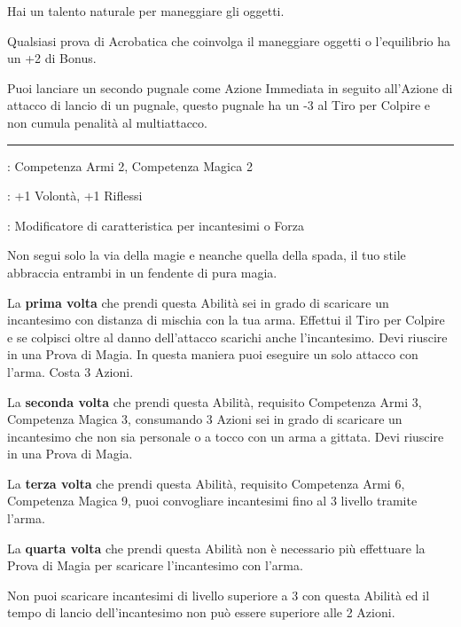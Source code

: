 \begin{multicols}{2}
Hai un talento naturale per maneggiare gli oggetti.

Qualsiasi prova di Acrobatica che coinvolga il maneggiare oggetti o l'equilibrio ha un +2 di Bonus.

Puoi lanciare un secondo pugnale come Azione Immediata in seguito all'Azione di attacco di lancio di un pugnale, questo pugnale ha un -3 al Tiro per Colpire e non cumula penalità al multiattacco.

\smallskip\noindent\rule{\linewidth}{2pt} \hypertarget{Guerriero della Magia}{}\medskip{}
\noindent
\begin{description}[noitemsep, topsep=0pt, parsep=0pt, partopsep=0pt, leftmargin=0cm, labelwidth=2.5cm]
    \item[\textbf{Requisito}]: Competenza Armi 2, Competenza Magica 2
    \item[\textbf{Tiri Salvezza}]: +1 Volontà, +1 Riflessi
    \item[\textbf{Caratteristica}]: Modificatore di caratteristica per incantesimi o Forza
\end{description}

Non segui solo la via della magie e neanche quella della spada, il tuo stile abbraccia entrambi in un fendente di pura magia.

La \textbf{prima volta} che prendi questa Abilità sei in grado di scaricare un incantesimo con distanza di mischia con la tua arma. Effettui il Tiro per Colpire e se colpisci oltre al danno dell'attacco scarichi anche l'incantesimo. Devi riuscire in una Prova di Magia. In questa maniera puoi eseguire un solo attacco con l'arma. Costa 3 Azioni.

La \textbf{seconda volta} che prendi questa Abilità, requisito Competenza Armi 3, Competenza Magica 3, consumando 3 Azioni sei in grado di scaricare un incantesimo che non sia personale o a tocco con un arma a gittata. Devi riuscire in una Prova di Magia.

La \textbf{terza volta} che prendi questa Abilità, requisito Competenza Armi 6, Competenza Magica 9, puoi convogliare incantesimi fino al 3 livello tramite l'arma.

La \textbf{quarta volta} che prendi questa Abilità non è necessario più effettuare la Prova di Magia per scaricare l'incantesimo con l'arma.

Non puoi scaricare incantesimi di livello superiore a 3 con questa Abilità ed il tempo di lancio dell'incantesimo non può essere superiore alle 2 Azioni.


\end{multicols}
